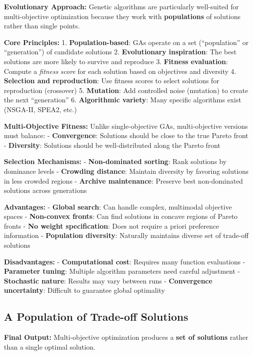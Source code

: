 \documentclass[
  letterpaper,
  DIV=11,
  numbers=noendperiod]{scrreprt}
\begin{document}
\textbf{Evolutionary Approach:} Genetic algorithms are particularly
well-suited for multi-objective optimization because they work with
\textbf{populations} of solutions rather than single points.

\textbf{Core Principles:} 1. \textbf{Population-based}: GAs operate on a
set (``population'' or ``generation'') of candidate solutions 2.
\textbf{Evolutionary inspiration}: The best solutions are more likely to
survive and reproduce 3. \textbf{Fitness evaluation}: Compute a
\emph{fitness score} for each solution based on objectives and diversity
4. \textbf{Selection and reproduction}: Use fitness scores to select
solutions for reproduction (crossover) 5. \textbf{Mutation}: Add
controlled noise (mutation) to create the next ``generation'' 6.
\textbf{Algorithmic variety}: Many specific algorithms exist (NSGA-II,
SPEA2, etc.)

\textbf{Multi-Objective Fitness:} Unlike single-objective GAs,
multi-objective versions must balance: - \textbf{Convergence}: Solutions
should be close to the true Pareto front - \textbf{Diversity}: Solutions
should be well-distributed along the Pareto front

\textbf{Selection Mechanisms:} - \textbf{Non-dominated sorting}: Rank
solutions by dominance levels - \textbf{Crowding distance}: Maintain
diversity by favoring solutions in less crowded regions -
\textbf{Archive maintenance}: Preserve best non-dominated solutions
across generations

\textbf{Advantages:} - \textbf{Global search}: Can handle complex,
multimodal objective spaces - \textbf{Non-convex fronts}: Can find
solutions in concave regions of Pareto fronts - \textbf{No weight
specification}: Does not require a priori preference information -
\textbf{Population diversity}: Naturally maintains diverse set of
trade-off solutions

\textbf{Disadvantages:} - \textbf{Computational cost}: Requires many
function evaluations - \textbf{Parameter tuning}: Multiple algorithm
parameters need careful adjustment - \textbf{Stochastic nature}: Results
may vary between runs - \textbf{Convergence uncertainty}: Difficult to
guarantee global optimality

\subsection{A Population of Trade-off
Solutions}\label{a-population-of-trade-off-solutions}

\textbf{Final Output:} Multi-objective optimization produces a
\textbf{set of solutions} rather than a single optimal solution.
\end{document}
